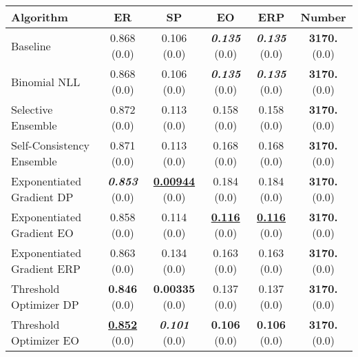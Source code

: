 \begin{tabular} {|l|c|c|c|c|c|}
\hline
\textbf{Algorithm} & \textbf{ER} & \textbf{SP} & \textbf{EO} & \textbf{ERP} & \textbf{Number} \\ \hline
Baseline & 0.868 (0.0) & 0.106 (0.0) & \textbf{\textit{0.135}} (0.0) & \textbf{\textit{0.135}} (0.0) & \textbf{3170.} (0.0) \\ \hline 
Binomial NLL & 0.868 (0.0) & 0.106 (0.0) & \textbf{\textit{0.135}} (0.0) & \textbf{\textit{0.135}} (0.0) & \textbf{3170.} (0.0) \\ \hline 
Selective Ensemble & 0.872 (0.0) & 0.113 (0.0) & 0.158 (0.0) & 0.158 (0.0) & \textbf{3170.} (0.0) \\ \hline 
Self-Consistency Ensemble & 0.871 (0.0) & 0.113 (0.0) & 0.168 (0.0) & 0.168 (0.0) & \textbf{3170.} (0.0) \\ \hline 
Exponentiated Gradient DP & \textbf{\textit{0.853}} (0.0) & \textbf{\underline{0.00944}} (0.0) & 0.184 (0.0) & 0.184 (0.0) & \textbf{3170.} (0.0) \\ \hline 
Exponentiated Gradient EO & 0.858 (0.0) & 0.114 (0.0) & \textbf{\underline{0.116}} (0.0) & \textbf{\underline{0.116}} (0.0) & \textbf{3170.} (0.0) \\ \hline 
Exponentiated Gradient ERP & 0.863 (0.0) & 0.134 (0.0) & 0.163 (0.0) & 0.163 (0.0) & \textbf{3170.} (0.0) \\ \hline 
Threshold Optimizer DP & \textbf{0.846} (0.0) & \textbf{0.00335} (0.0) & 0.137 (0.0) & 0.137 (0.0) & \textbf{3170.} (0.0) \\ \hline 
Threshold Optimizer EO & \textbf{\underline{0.852}} (0.0) & \textbf{\textit{0.101}} (0.0) & \textbf{0.106} (0.0) & \textbf{0.106} (0.0) & \textbf{3170.} (0.0) \\ \hline 
\end{tabular}